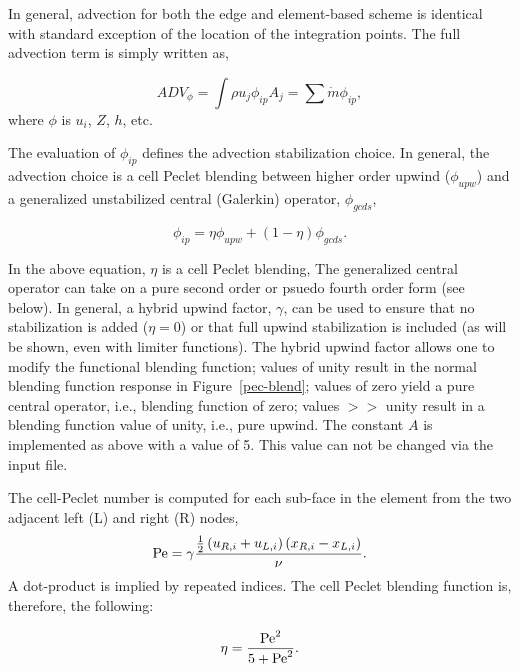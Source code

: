 In general, advection for both the edge and element-based
scheme is identical with standard exception of the location of the integration
points. The full advection term is simply written as,

\begin{equation}
  ADV_{\phi} = \int \rho u_j \phi_{ip} A_j = \sum \dot{m} \phi_{ip},
\label{advForm}
\end{equation}
%
where $\phi$ is $u_i$, $Z$, $h$, etc.

The evaluation of $\phi_{ip}$ defines the advection stabilization choice. 
In general, the advection choice is a cell Peclet blending between higher
order upwind ($\phi_{upw}$) and a generalized unstabilized central 
(Galerkin) operator, $\phi_{gcds}$,

\begin{equation}
  \phi_{ip} = \eta \phi_{upw} + (1-\eta)\phi_{gcds}.
\end{equation}
\label{advPhiIP}
%

In the above equation, $\eta$ is a cell Peclet blending, The generalized
central operator can take on a pure second order or psuedo fourth order form (see below). 
In general, a hybrid upwind factor, $\gamma$, can be used to ensure that no stabilization 
is added ($\eta = 0$) or that full upwind stabilization is included (as will be shown, 
even with limiter functions). The hybrid upwind factor allows one to modify the functional
blending function; values of unity result in the normal blending function 
response in  Figure~\ref{pec-blend}; values of zero yield
a pure central operator, i.e., blending function of zero; values $>>$ unity result 
in a blending function value of unity, i.e., pure upwind. The constant $A$
is implemented as above with a value of 5. This value can not be changed
via the input file.

The cell-Peclet number is computed for each sub-face in the element
from the two adjacent left (L) and right (R) nodes,
\begin{equation}
   {\rm Pe} = \gamma {{{1 \over 2} \left( u_{R,i} + u_{L,i} \right) 
                      \left( x_{R,i} - x_{L,i} \right) } \over \nu }.
\end{equation}
A dot-product is implied by repeated indices. The cell Peclet blending
function is, therefore, the following:

\begin{equation}
  \eta = \frac {{\rm Pe}^2} {5 + {\rm Pe}^2}.
\end{equation}

